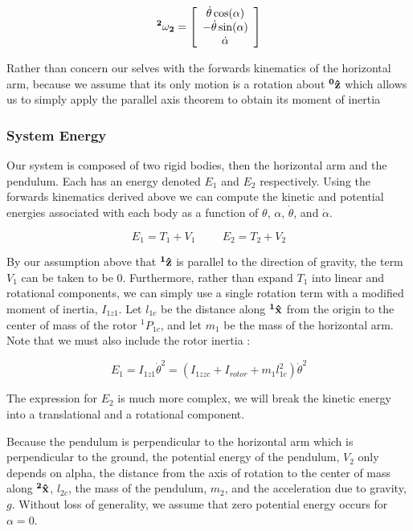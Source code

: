 \documentclass{article}
\theoremstyle{plain}
\theoremstyle{definition}
\theoremstyle{remark}
\begin{document}
$$  {\bf{^2\omega_{2}}}= \left[ \begin{array}{c l}   \dot{\theta} \cos(\alpha) \\ -\dot{\theta} \sin(\alpha) \\ \dot{\alpha} \end{array} \right]$$

Rather than concern our selves with the forwards kinematics of the horizontal arm, because we assume that its only motion is a rotation about $\bf{^0\hat{z}}$ which allows us to simply apply the parallel axis theorem to obtain its moment of inertia 


\subsubsection*{System Energy}

Our system is composed of two rigid bodies, then the horizontal arm and the pendulum.  Each has an energy denoted $E_1$ and $E_2$ respectively.  Using the forwards kinematics derived above we can compute the kinetic and potential energies associated with each body as a function of $\theta$, $\alpha$, $\dot{\theta}$, and $\dot{\alpha}$.

$$ E_{1} = T_{1} + V_{1} \hspace{1cm} E_{2} = T_{2} + V_{2} $$

By our assumption above that $\bf{^1\hat{z}}$ is parallel to the direction of gravity, the term $V_{1}$ can be taken to be 0.  Furthermore, rather than expand $T_{1}$ into linear and rotational components, we can simply use a single rotation term with a modified moment of inertia, $I_{1z1}$.  Let $l_{1c}$ be the distance along $\bf{^1\hat{x}}$ from the origin to the center of mass of the rotor $^1P_{1c}$, and let $m_{1}$ be the mass of the horizontal arm.  Note that we must also include the rotor inertia :

$$ E_{1} = I_{1z1} \dot{\theta}^2 = \left( I_{1zzc} + I_{rotor} + m_{1} l_{1c}^2 \right) \dot{\theta}^2$$

The expression for $E_{2}$ is much more complex, we will break the kinetic energy into a translational and a rotational component. 

Because the pendulum is perpendicular to the horizontal arm which is perpendicular to the ground, the potential energy of the pendulum, $V_{2}$ only depends on alpha, the distance from the axis of rotation to the center of mass along $\bf{^2\hat{x}}$, $l_{2c}$, the mass of the pendulum, $m_{2}$, and the acceleration due to gravity, $g$.  Without loss of generality, we assume that zero potential energy occurs for $\alpha = 0$.
\end{document}
